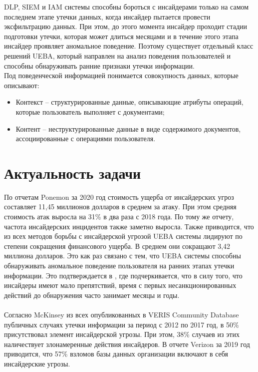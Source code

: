 DLP, SIEM и IAM системы способны бороться с инсайдерами только на самом последнем этапе утечки данных, когда инсайдер пытается провести эксфильтрацию данных. При этом, до этого момента инсайдер проходит стадии подготовки утечки, которая может длиться месяцами и в течение этого этапа инсайдер проявляет аномальное поведение. Поэтому существует отдельный класс решений UEBA, который направлен на анализ поведения пользователей и способны обнаруживать ранние признаки утечки информации.\\

Под поведенческой информацией понимается совокупность данных, которые описывают:\\
\begin{itemize}
\item Контекст – структурированные данные, описывающие атрибуты операций, которые пользователь выполняет с документами;
\item Контент – неструктурированные данные в виде содержимого документов, ассоциированные с операциями пользователя.
\end{itemize}

\section*{Актуальность задачи}

По отчетам Ponemon за 2020 год \cite{PonemonReport20182018} стоимость ущерба от инсайдерских угроз составляет 11,45 миллионов долларов в среднем за атаку. При этом средняя стоимость атак выросла на 31\% в два раза с 2018 года. По тому же отчету, частота инсайдерских инцидентов также заметно выросла. Также приводится, что из всех методов борьбы с инсайдерской угрозой UEBA системы лидируют по степени сокращения финансового ущерба. В среднем они сокращают 3,42 миллиона долларов. Это как раз связано с тем, что UEBA системы способны обнаруживать аномальное поведение пользователя на ранних этапах утечки информации. Это подтверждается в \cite{2019InsiderThreat}, где подчеркивается, что в силу того, что инсайдеры имеют мало препятствий, время с первых несанкционированных действий до обнаружения часто занимает месяцы и годы.\\ \\

Согласно McKinsey \cite{InsiderThreatHuman} из всех опубликованных в VERIS Community Database публичных случаях утечки информации за период с 2012 по 2017 год, в 50\% присутствовал элемент инсайдерской угрозы. При этом, 38\% случаев из этих наличествует злонамеренные действия инсайдеров. В отчете Verizon за 2019 год \cite{2019InsiderThreat} приводится, что 57\% взломов базы данных организации включают в себя инсайдерские угрозы.\\

